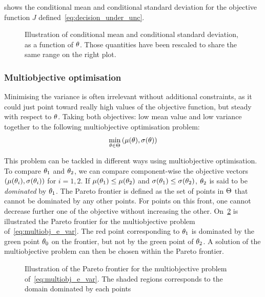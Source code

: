 \documentclass[../../Main_ManuscritThese.tex]{subfiles}
\newcommand\imgpath{/home/victor/acadwriting/Manuscrit/Text/Chapter3/img/}
\begin{document}
 shows the conditional mean and conditional
standard deviation for the objective function $J$
defined~\cref{eq:decision_under_unc}.
\begin{figure}[ht]
  \centering
  
  \caption[Conditional mean and standard deviation]{Illustration of
    conditional mean and conditional standard deviation, as a function
    of $\theta$. Those quantities have been rescaled to share the same
    range on the right plot.}
  \label{fig:mean_std} 
\end{figure}

\subsubsection{Multiobjective optimisation}
\label{sec:multiobjective_optimization}
Minimising the variance is often irrelevant without additional
constraints, as it could just point toward really high values of the
objective function, but steady with respect to $\theta$. Taking both
objectives: low mean value and low variance together to the following
multiobjective optimisation problem:
\begin{align}
  \label{eq:multiobj_e_var}
  \min_{\theta\in\Theta} \left(\mu(\theta),\sigma(\theta)\right)
\end{align}


This problem can be tackled in different ways using multiobjective optimisation.
To compare $\theta_1$ and $\theta_2$, we can compare component-wise the
objective vectors $(\mu(\theta_i),\sigma(\theta_i))$ for $i=1,2$. If
$\mu(\theta_1) \leq \mu(\theta_2)$ and $\sigma(\theta_1) \leq \sigma(\theta_2)$,
$\theta_2$ is said to be \emph{dominated} by $\theta_1$. The Pareto frontier
is defined as the set of points in $\Theta$ that cannot be dominated
by any other points. For points on this front, one cannot decrease
further one of the objective without increasing the other.
On~\cref{fig:pareto} is illustrated the Pareto frontier for the
multiobjective problem of~\cref{eq:multiobj_e_var}. The red point
corresponding to $\theta_1$ is dominated by the green point $\theta_0$ on
the frontier, but not by the green point of $\theta_2$. A solution of the
multiobjective problem can then be chosen within the Pareto frontier.

\begin{figure}[ht]
  \centering
  
  \caption[Pareto frontier]{\label{fig:pareto} 
 Illustration of the Pareto frontier for the multiobjective problem of~\cref{eq:multiobj_e_var}. The shaded regions corresponds to the domain dominated by each points}
\end{figure}
\end{document}

